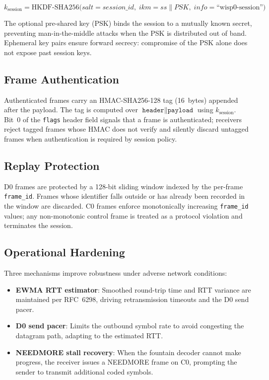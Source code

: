 \documentclass[11pt,twocolumn]{article}
\theoremstyle{definition}
\begin{document}
\begin{equation}
  k_{\text{session}} = \text{HKDF-SHA256}\!\bigl(
    \mathit{salt} = \mathit{session\_id},\;
    \mathit{ikm} = \mathit{ss} \| \mathit{PSK},\;
    \mathit{info} = \text{``wisp0-session''}
  \bigr)
  \label{eq:session-key}
\end{equation}

The optional pre-shared key (PSK) binds the session to a mutually known
secret, preventing man-in-the-middle attacks when the PSK is distributed
out of band. Ephemeral key pairs ensure forward secrecy: compromise of
the PSK alone does not expose past session keys.

\subsection{Frame Authentication}

Authenticated frames carry an HMAC-SHA256-128 tag (16~bytes) appended
after the payload. The tag is computed over
$\texttt{header} \| \texttt{payload}$ using $k_{\text{session}}$.
Bit~0 of the \texttt{flags} header field signals that a frame is
authenticated; receivers reject tagged frames whose HMAC does not verify
and silently discard untagged frames when authentication is required by
session policy.

\subsection{Replay Protection}

D0 frames are protected by a 128-bit sliding window indexed by the
per-frame \texttt{frame\_id}. Frames whose identifier falls outside or
has already been recorded in the window are discarded. C0 frames enforce
monotonically increasing \texttt{frame\_id} values; any non-monotonic
control frame is treated as a protocol violation and terminates the
session.

\subsection{Operational Hardening}

Three mechanisms improve robustness under adverse network conditions:
\begin{itemize}
  \item \textbf{EWMA RTT estimator}: Smoothed round-trip time and RTT
    variance are maintained per RFC~6298, driving retransmission timeouts
    and the D0 send pacer.
  \item \textbf{D0 send pacer}: Limits the outbound symbol rate to avoid
    congesting the datagram path, adapting to the estimated RTT.
  \item \textbf{NEEDMORE stall recovery}: When the fountain decoder
    cannot make progress, the receiver issues a NEEDMORE frame on C0,
    prompting the sender to transmit additional coded symbols.
\end{itemize}
\end{document}
